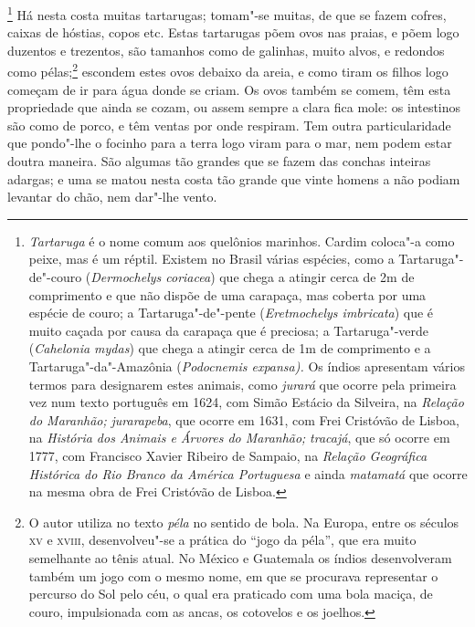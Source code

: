 \footnote{ \textit{Tartaruga} é o nome comum aos
quelônios marinhos. Cardim coloca"-a como peixe, mas é um réptil.
Existem no Brasil várias espécies, como a Tartaruga"-de"-couro
(\textit{Dermochelys coriacea}) que chega a atingir cerca de 2m de
comprimento e que não dispõe de uma carapaça, mas coberta por uma
espécie de couro; a Tartaruga"-de"-pente (\textit{Eretmochelys
imbricata}) que é muito caçada por causa da carapaça que é preciosa; a
Tartaruga"-verde (\textit{Cahelonia mydas}) que chega a atingir cerca
de 1m de comprimento e a Tartaruga"-da"-Amazônia (\textit{Podocnemis
expansa).} Os índios apresentam vários termos para designarem estes
animais, como \textit{jurará} que ocorre pela primeira vez num texto
português em 1624, com Simão Estácio da Silveira, na \textit{Relação do
Maranhão;} \textit{jurarapeba}, que ocorre em 1631, com Frei Cristóvão
de Lisboa, na \textit{História dos Animais e Árvores do Maranhão;} 
\textit{tracajá}, que só ocorre em 1777, com Francisco Xavier Ribeiro
de Sampaio, na \textit{Relação Geográfica Histórica do Rio Branco da
América Portuguesa} e ainda \textit{matamatá} que ocorre na mesma obra
de Frei Cristóvão de Lisboa.} Há nesta costa muitas
tartarugas; tomam"-se muitas, de que se fazem cofres, caixas de hóstias,
copos etc. Estas tartarugas põem ovos nas praias, e põem logo duzentos
e trezentos, são tamanhos como de galinhas, muito alvos, e redondos
como pélas;\footnote{ O autor utiliza no texto \textit{péla} no sentido
de bola. Na Europa, entre os séculos \textsc{xv} e \textsc{xviii}, desenvolveu"-se a
prática do ``jogo da péla'', que era muito semelhante ao tênis atual. No
México e Guatemala os índios desenvolveram também um jogo com o mesmo
nome, em que se procurava representar o percurso do Sol pelo céu, o
qual era praticado com uma bola maciça, de couro, impulsionada com as
ancas, os cotovelos e os joelhos.} escondem estes ovos debaixo da
areia, e como tiram os filhos logo começam de ir para água donde se
criam. Os ovos também se comem, têm esta propriedade que ainda se
cozam, ou assem sempre a clara fica mole: os intestinos são como de
porco, e têm ventas por onde respiram. Tem outra particularidade que
pondo"-lhe o focinho para a terra logo viram para o mar, nem podem
estar doutra maneira. São algumas tão grandes que se fazem das conchas
inteiras adargas; e uma se matou nesta costa tão grande que vinte
homens a não podiam levantar do chão, nem dar"-lhe vento.

